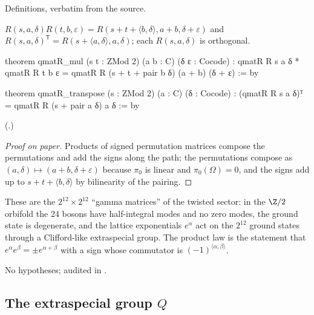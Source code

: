 \begin{status}
Definitions, verbatim from the source.
\end{status}
\begin{theorem}\label{ch21:thm:qmatRmul}
$R(s,a,\delta)R(t,b,\varepsilon)=R(s+t+\langle b,\delta\rangle,a+b,\delta+\varepsilon)$ and
$R(s,a,\delta)^{\mathsf T}=R(s+\langle a,\delta\rangle,a,\delta)$; each $R(s,a,\delta)$ is orthogonal.
\end{theorem}
\begin{leancode}
theorem qmatR_mul (s t : ZMod 2) (a b : C) (δ ε : Cocode) :
    qmatR R s a δ * qmatR R t b ε = qmatR R (s + t + pair b δ) (a + b) (δ + ε) := by
\end{leancode}
\begin{leancode}
theorem qmatR_transpose (s : ZMod 2) (a : C) (δ : Cocode) :
    (qmatR R s a δ)ᵀ = qmatR R (s + pair a δ) a δ := by
\end{leancode}
(.)
\begin{proof}[Proof on paper]
Products of signed permutation matrices compose the permutations and add the signs along the path;
the permutations compose as $(a,\delta)\mapsto(a+b,\delta+\varepsilon)$ because $\pi_0$ is linear and
$\pi_0(\Omega)=0$, and the signs add up to $s+t+\langle b,\delta\rangle$ by bilinearity of the pairing.
\end{proof}
\begin{physics}
These are the $2^{12}\times2^{12}$ ``gamma matrices'' of the twisted sector: in the $\Z/2$ orbifold
the $24$ bosons have half-integral modes and no zero modes, the ground state is degenerate, and the
lattice exponentials $e^\alpha$ act on the $2^{12}$ ground states through a Clifford-like extraspecial
group.  The product law is the statement that $e^{\alpha}e^{\beta}=\pm e^{\alpha+\beta}$ with a sign
whose commutator is $(-1)^{\langle\alpha,\beta\rangle}$.
\end{physics}
\begin{status}
No hypotheses;  audited in .
\end{status}

\subsection{The extraspecial group \texorpdfstring{$Q$}{Q}}


